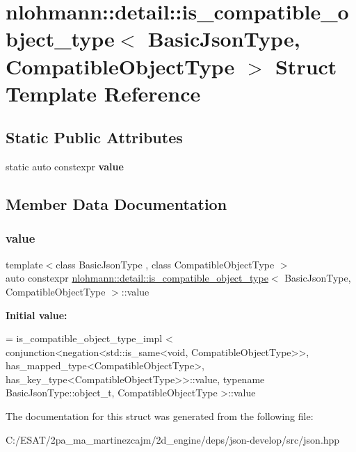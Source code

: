 \hypertarget{structnlohmann_1_1detail_1_1is__compatible__object__type}{}\section{nlohmann\+:\+:detail\+:\+:is\+\_\+compatible\+\_\+object\+\_\+type$<$ Basic\+Json\+Type, Compatible\+Object\+Type $>$ Struct Template Reference}
\label{structnlohmann_1_1detail_1_1is__compatible__object__type}
\subsection*{Static Public Attributes}
\begin{DoxyCompactItemize}
\item 
static auto constexpr {\bfseries value}
\end{DoxyCompactItemize}


\subsection{Member Data Documentation}
\mbox{\label{structnlohmann_1_1detail_1_1is__compatible__object__type_a87cce7bcdcd22cc8517f171705f6a7c7}} 
\subsubsection{\texorpdfstring{value}{value}}
{\footnotesize\ttfamily template$<$class Basic\+Json\+Type , class Compatible\+Object\+Type $>$ \\
auto constexpr \hyperlink{structnlohmann_1_1detail_1_1is__compatible__object__type}{nlohmann\+::detail\+::is\+\_\+compatible\+\_\+object\+\_\+type}$<$ Basic\+Json\+Type, Compatible\+Object\+Type $>$\+::value\hspace{0.3cm}{\ttfamily [static]}}

{\bfseries Initial value\+:}
\begin{DoxyCode}
= is\_compatible\_object\_type\_impl <
                                  conjunction<negation<std::is\_same<void, CompatibleObjectType>>,
                                  has\_mapped\_type<CompatibleObjectType>,
                                  has\_key\_type<CompatibleObjectType>>::value,
                                  \textcolor{keyword}{typename} BasicJsonType::object\_t, CompatibleObjectType >::value
\end{DoxyCode}


The documentation for this struct was generated from the following file\+:\begin{DoxyCompactItemize}
\item 
C\+:/\+E\+S\+A\+T/2pa\+\_\+ma\+\_\+martinezcajm/2d\+\_\+engine/deps/json-\/develop/src/json.\+hpp\end{DoxyCompactItemize}
